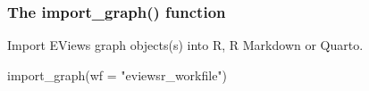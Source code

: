 \documentclass[
  letterpaper,
  DIV=11,
  numbers=noendperiod]{scrartcl}
\newenvironment{Shaded}{\begin{snugshade}}{\end{snugshade}}
\newcommand{\AttributeTok}[1]{\textcolor[rgb]{0.40,0.45,0.13}{#1}}
\newcommand{\FunctionTok}[1]{\textcolor[rgb]{0.28,0.35,0.67}{#1}}
\newcommand{\NormalTok}[1]{\textcolor[rgb]{0.00,0.23,0.31}{#1}}
\newcommand{\StringTok}[1]{\textcolor[rgb]{0.13,0.47,0.30}{#1}}
\begin{document}
\begin{figure}

\end{figure}

\hypertarget{the-import_graph-function}{%
\subsubsection{The import\_graph()
function}\label{the-import_graph-function}}

Import EViews graph objects(s) into R, R Markdown or Quarto.

\begin{Shaded}
\begin{Highlighting}[]
\FunctionTok{import\_graph}\NormalTok{(}\AttributeTok{wf =} \StringTok{"eviewsr\_workfile"}\NormalTok{)}
\end{Highlighting}
\end{Shaded}
\end{document}
